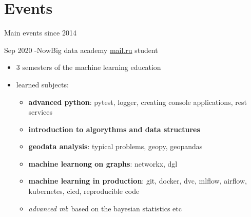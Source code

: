 \documentclass[letterpaper]{twentysecondcv} %
\begin{document}

\section{Events}

Main events since 2014

\begin{twenty}
        \twentyitem
        {Sep 2020 -}{Now}{Big data academy}
        {\href{http://data.mail.ru/}{mail.ru} }{student}
        {
            {\begin{itemize}
                \item 3 semesters of the machine learning education
                \item learned subjects:
                    {\begin{itemize}
                    \item \textbf{advanced python}: pytest, logger, creating console applications, rest services
                    \item \textbf{introduction to algorythms and data structures}
                    \item \textbf{geodata analysis}: typical problems, geopy, geopandas
                    \item \textbf{machine learnong on graphs}: networkx, dgl
                    \item \textbf{machine learning in production}: git, docker, dvc, mlflow, airflow, kubernetes, cicd, reproducible code
                    \item \emph{advanced ml}: based on the bayesian statistics etc
                    \end{itemize}}


\end{itemize}}}
\end{twenty}
\end{document}
